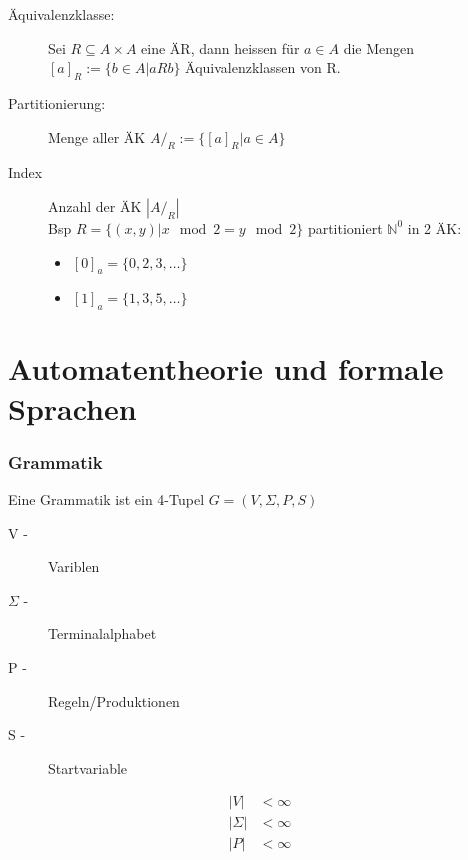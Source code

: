 \documentclass{scrartcl}
\begin{document}
\begin{description}
    \item[Äquivalenzklasse:] Sei $R \subseteq A\times A$ eine ÄR, dann heissen für $a\in A$ die Mengen $[a]_R:=\{b\in A | aRb\}$ Äquivalenzklassen von R.
    \item[Partitionierung:] Menge aller ÄK $A/_R:=\{[a]_R | a\in A\}$
    \item[Index] Anzahl der ÄK $|A/_R|$ \\
    Bsp $R=\{(x,y) | x \mod 2 = y \mod 2\}$ partitioniert $\mathds{N}^0$ in 2 ÄK:
    \begin{itemize}
        \item $[0]_a = \{0,2,3,\dots\}$
        \item $[1]_a = \{1,3,5,\dots\}$
    \end{itemize}
\end{description}

\part*{Automatentheorie und formale Sprachen}
\section*{Grammatik}
Eine Grammatik ist ein 4-Tupel $G=(V,\Sigma,P,S)$ \\[.5cm]
\begin{minipage}[t]{4.5cm}
\begin{description}
\item[V -] Variblen
\item[$\Sigma$ -] Terminalalphabet
\item[P -] Regeln/Produktionen
\item[S -] Startvariable
\end{description}
\end{minipage}
\begin{minipage}[t]{10cm}
    \begin{align*}
        |V|         & < \infty \\
        |\Sigma|    & < \infty \\
        |P|         & < \infty
    \end{align*}
\end{minipage}
\end{document}
